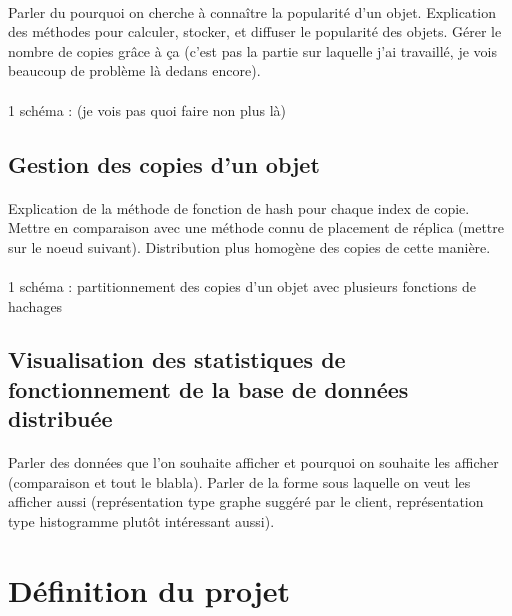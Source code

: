 \documentclass[12pt]{article}
\begin{document}
\paragraph{} Parler du pourquoi on cherche à connaître la popularité d'un objet. Explication des méthodes pour calculer, stocker, et diffuser le popularité des objets. Gérer le nombre de copies grâce à ça (c'est pas la partie sur laquelle j'ai travaillé, je vois beaucoup de problème là dedans encore).

\paragraph{} 1 schéma : (je vois pas quoi faire non plus là)

\subsection{Gestion des copies d'un objet}
\paragraph{} Explication de la méthode de fonction de hash pour chaque index de copie. Mettre en comparaison avec une méthode connu de placement de réplica (mettre sur le noeud suivant). Distribution plus homogène des copies de cette manière.

\paragraph{} 1 schéma : partitionnement des copies d'un objet avec plusieurs fonctions de hachages

\subsection{Visualisation des statistiques de fonctionnement de la base de données distribuée}
\paragraph{} Parler des données que l'on souhaite afficher et pourquoi on souhaite les afficher (comparaison et tout le blabla). Parler de la forme sous laquelle on veut les afficher aussi (représentation type graphe suggéré par le client, représentation type histogramme plutôt intéressant aussi).


\section{Définition du projet}
\end{document}
